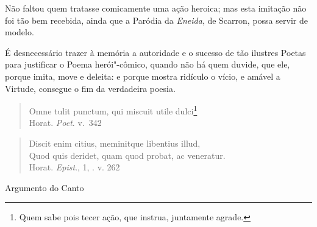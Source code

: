 Não faltou quem tratasse comicamente uma ação heroica; 
mas esta imitação não foi tão bem recebida, ainda que a 
Paródia da \textit{Eneida}, de Scarron, possa servir de modelo. 

É desnecessário trazer à memória a autoridade e o 
sucesso de tão ilustres Poetas para justificar o Poema 
herói"-cômico, quando não há quem duvide, que ele, 
porque imita, move e deleita: e porque mostra ridículo o 				\index{\Util}
vício, e amável a Virtude, consegue o fim da verdadeira poesia.

\begin{verse}
Omne tulit punctum, qui miscuit utile dulci\footnote{ Quem sabe pois
tecer ação, que instrua, juntamente agrade.}\\[10pt]

\hfill Horat. \textit{Poet}. v.~342 
\end{verse}

\medskip

\begin{verse}
Discit enim citius, meminitque libentius illud,\\[-15pt]
Quod quis deridet, quam quod probat, ac \qb{}veneratur. 
\\[10pt]

\hfill Horat. \textit{Epist}., 1, . v. 262
\end{verse}

\pagebreak
\paginabranca

\mbox{}\vfill
\thispagestyle{empty}
\noindent Argumento do Canto 
\medskip

